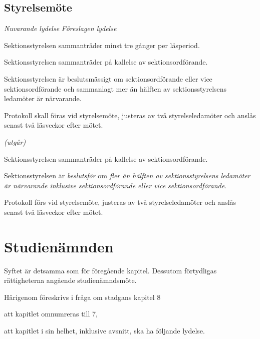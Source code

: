 \documentclass{article}
\newenvironment{lydelse}
    {\begin{paracol}{2}%
        \emph{Nuvarande lydelse}%
        \switchcolumn%
        \emph{Föreslagen lydelse}%
    \end{paracol}%
    \begin{enumerate}[label=\thesubsection.\arabic*]%
    \begin{paracol}{2}%
    }{\end{paracol}\end{enumerate}}
\begin{document}
\subsection{Styrelsemöte}
\begin{lydelse}
  \setcounter{section}{7}
  \setcounter{subsection}{5}
  \item Sektionsstyrelsen sammanträder minst tre gånger per läsperiod.
  \item Sektionsstyrelsen sammanträder på kallelse av sektionsordförande.
  \setcounter{subsection}{6}
  \setcounter{enumi}{0}
  \item Sektionsstyrelsen är beslutsmässigt om sektionsordförande eller vice sektionsordförande och sammanlagt mer än hälften av sektionsstyrelsens ledamöter är närvarande.
  \setcounter{subsection}{8}
  \setcounter{enumi}{0}
  \item Protokoll skall föras vid styrelsemöte, justeras av två
    styrelseledamöter och anslås senast två läsveckor efter mötet.
  \switchcolumn  

  \item[] \emph{(utgår)}
  \item Sektionsstyrelsen sammanträder på kallelse av sektionsordförande.
  \item Sektionsstyrelsen är \emph{beslutsför} om \emph{fler än hälften av sektionsstyrelsens ledamöter är närvarande inklusive sektionsordförande eller vice sektionsordförande}.
  \item Protokoll förs vid styrelsemöte, justeras av två styrelseledamöter och anslås senast två läsveckor efter mötet.
\end{lydelse}
\setcounter{section}{6}
\setcounter{subsection}{2}

\section{Studienämnden}
Syftet är detsamma som för föregående kapitel.
Dessutom förtydligas rättigheterna angående studienämndsmöte.

Härigenom föreskrivs i fråga om stadgans kapitel 8
\begin{dels}
\item att kapitlet omnumreras till 7,
\item att kapitlet i sin helhet, inklusive avsnitt, ska ha följande lydelse.
\end{dels}
\end{document}
